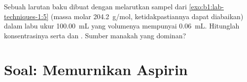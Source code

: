 \begin{exercise}[$\star\star\star$]\label{exo:b1:lab-techniques-1:12}
Sebuah larutan baku dibuat dengan melarutkan sampel dari
\cref{exo:b1:lab-techniques-1:5} (massa molar \qty{204.2}{g/mol},
ketidakpastiannya dapat diabaikan) dalam labu ukur \qty{100.00}{mL} yang
volumenya mempunyai  \qty{0.06}{mL}. Hitunglah
konsentrasinya serta  dan . Sumber manakah yang dominan?
\end{exercise}

\section{Soal: Memurnikan Aspirin}

